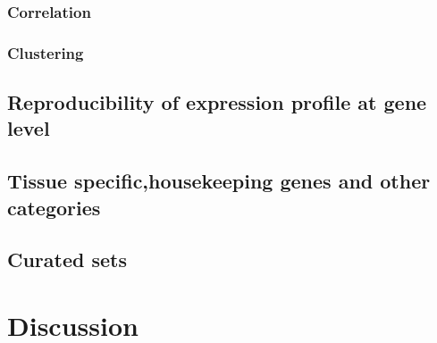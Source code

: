         \subsubsection{Correlation}\label{subsubsec:Trans_Tissue_Corr}
        \subsubsection{Clustering}\label{subsubsec:Trans_Tissue_cluster}

    \subsection{Reproducibility of expression profile at gene level}\label{subsec:Trans_ReproExpresGene}

    \subsection{Tissue specific,housekeeping genes and other categories}\label{subsec:Trans_TissueSpeAndHK}

    \subsection{Curated sets}\label{subsec:Trans_curatedSets}

\section{Discussion}\label{sec:Trans_discussion}



\begin{comment}
  \begin{figure}%
      \includegraphics%
      {transcriptomics/}\centering
      \caption[]
      {\label{fig:}\textbf{}}
  \end{figure}
\end{comment}
